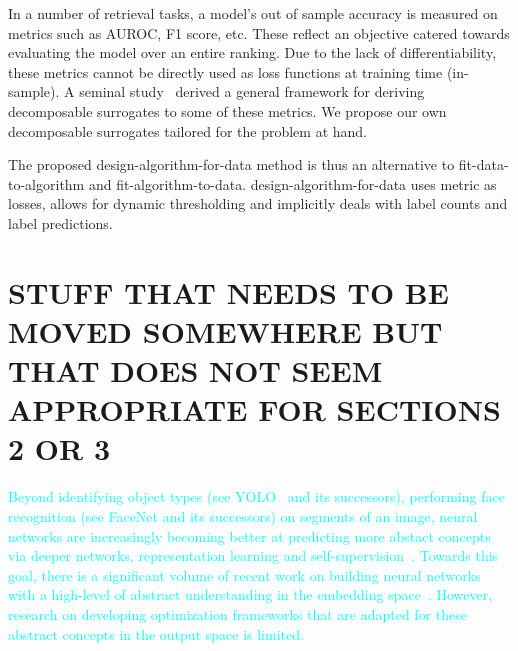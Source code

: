 In a number of retrieval tasks, a model's out of sample accuracy is measured
on metrics such as AUROC, F1 score, etc. These reflect an objective catered
towards evaluating the model over an entire ranking. Due to the lack of
differentiability, these metrics cannot be directly used as loss functions at
training time (in-sample). A seminal study~\cite{optimizableLosses} derived a
general framework for deriving decomposable surrogates to some of these
metrics. We propose our own decomposable surrogates tailored for the problem
at hand.

The proposed design-algorithm-for-data method is thus an alternative to fit-data-to-algorithm and fit-algorithm-to-data. design-algorithm-for-data uses metric as losses, allows for dynamic thresholding and implicitly deals with label counts and label predictions.




\section*{STUFF THAT NEEDS TO BE MOVED SOMEWHERE BUT THAT DOES NOT SEEM APPROPRIATE FOR SECTIONS 2 OR 3}

\textcolor{cyan}{
 Beyond identifying object types (see YOLO~\cite{YOLO} and its successors), performing face recognition (see FaceNet\cite{FaceNet} and its successors) on segments of an image, neural networks
are increasingly becoming better at predicting more abstact concepts via
deeper networks, representation learning and self-supervision~\citep[see,
e.g.,][]{SS,Rep}. Towards this goal, there is a significant volume of recent
work on building neural networks with a high-level of abstract understanding
in the embedding space~. However, research on developing optimization
frameworks that are adapted for these abstract concepts in the output space is
limited.
}
